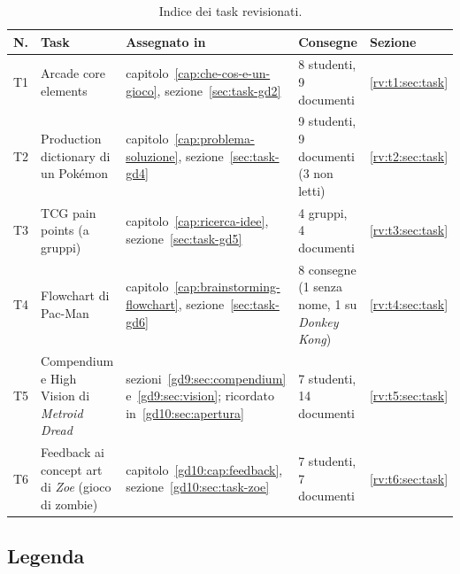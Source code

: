 \begin{table}[htbp]
  \centering
  \caption{Indice dei task revisionati.}
  \label{rv:tab:task}
  \small
  \begin{tabular}{@{}lp{2.6cm}p{3.2cm}p{2.2cm}l@{}}
    \toprule
    \textbf{N.} & \textbf{Task} & \textbf{Assegnato in} &
    \textbf{Consegne} & \textbf{Sezione} \\
    \midrule
    T1 & Arcade core elements & capitolo~\ref{cap:che-cos-e-un-gioco},
         sezione~\ref{sec:task-gd2} & 8 studenti, 9 documenti &
         \ref{rv:t1:sec:task} \\
    \addlinespace
    T2 & Production dictionary di un Pokémon & capitolo~\ref{cap:problema-soluzione},
         sezione~\ref{sec:task-gd4} & 9 studenti, 9 documenti (3 non letti) &
         \ref{rv:t2:sec:task} \\
    \addlinespace
    T3 & TCG pain points (a gruppi) & capitolo~\ref{cap:ricerca-idee},
         sezione~\ref{sec:task-gd5} & 4 gruppi, 4 documenti &
         \ref{rv:t3:sec:task} \\
    \addlinespace
    T4 & Flowchart di Pac-Man & capitolo~\ref{cap:brainstorming-flowchart},
         sezione~\ref{sec:task-gd6} & 8 consegne (1 senza nome, 1 su
         \emph{Donkey Kong}) & \ref{rv:t4:sec:task} \\
    \addlinespace
    T5 & Compendium e High Vision di \emph{Metroid Dread} &
         sezioni~\ref{gd9:sec:compendium} e~\ref{gd9:sec:vision};
         ricordato in~\ref{gd10:sec:apertura} & 7 studenti, 14 documenti &
         \ref{rv:t5:sec:task} \\
    \addlinespace
    T6 & Feedback ai concept art di \emph{Zoe} (gioco di zombie) &
         capitolo~\ref{gd10:cap:feedback},
         sezione~\ref{gd10:sec:task-zoe} & 7 studenti, 7 documenti &
         \ref{rv:t6:sec:task} \\
    \bottomrule
  \end{tabular}
\end{table}

\subsection{Legenda}


